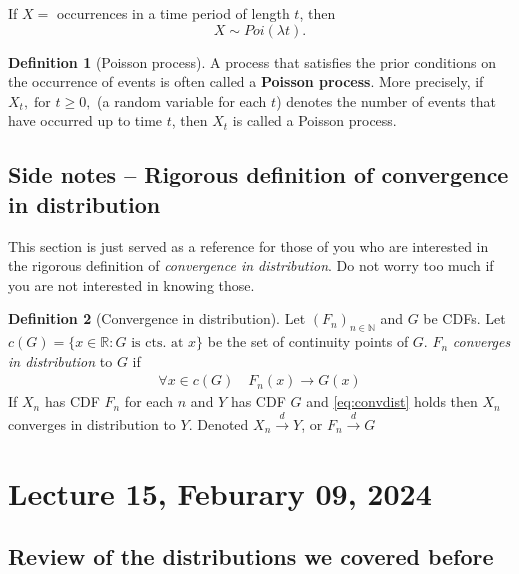 \documentclass[
]{book}
\theoremstyle{definition}
\newtheorem{definition}{Definition}[chapter]
\theoremstyle{definition}
\theoremstyle{definition}
\theoremstyle{definition}
\theoremstyle{remark}
\begin{document}
If \(X=\) occurrences in a time period of length \(t\), then
\[X\sim Poi(\lambda t).\]

\begin{definition}[Poisson process]
A process that satisfies the prior conditions on the occurrence of events is often called a \textbf{Poisson process}. More precisely, if \(X_t, \; \text{for } t\ge0,\) (a random variable for each \(t\)) denotes the number of events that have occurred up to time \(t\), then \(X_t\) is called a Poisson process.
\end{definition}

\hypertarget{side-notes-rigorous-definition-of-convergence-in-distribution}{%
\section{Side notes -- Rigorous definition of convergence in distribution}\label{side-notes-rigorous-definition-of-convergence-in-distribution}}

This section is just served as a reference for those of you who are interested in the rigorous definition of \emph{convergence in distribution}. Do not worry too much if you are not interested in knowing those.

\begin{definition}[Convergence in distribution]
Let \((F_n)_{n\in\mathbb{N}}\) and \(G\) be CDFs. Let \(c(G) = \{x\in\mathbb{R} : G \text{ is cts. at }x\}\) be the set of continuity points of \(G\). \(F_n\) \emph{converges in distribution} to \(G\) if
\begin{align}
    \forall x\in c(G) \quad F_n(x)\to G(x)  \label{eq:convdist}
\end{align}
If \(X_n\) has CDF \(F_n\) for each \(n\) and \(Y\) has CDF \(G\) and \eqref{eq:convdist} holds then \(X_n\) converges in distribution to \(Y\). Denoted \(X_n \stackrel{d}{\to} Y\), or \(F_n \stackrel{d}{\to} G\)
\end{definition}

\hypertarget{lecture-15-feburary-09-2024}{%
\chapter{Lecture 15, Feburary 09, 2024}\label{lecture-15-feburary-09-2024}}

\hypertarget{review-of-the-distributions-we-covered-before}{%
\section{Review of the distributions we covered before}\label{review-of-the-distributions-we-covered-before}}
\end{document}
